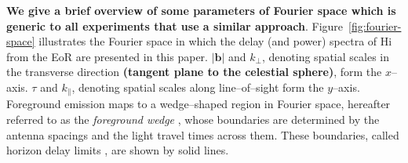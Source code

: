 \documentclass[preprint2,iop,numberedappendix,twocolappendix,appendixfloats]{emulateapj}
\begin{document}
{\bf We give a brief overview of some parameters of Fourier space which is generic to all experiments that use a similar approach}. Figure~\ref{fig:fourier-space} illustrates the Fourier space in which the delay (and power) spectra of H{\sc i} from the EoR are presented in this paper. $|\boldsymbol{b}|$ and $k_\perp$, denoting spatial scales in the transverse direction {\bf (tangent plane to the celestial sphere)}, form the $x$--axis. $\tau$ and $k_\parallel$, denoting spatial scales along line--of--sight form the $y$--axis. Foreground emission maps to a wedge--shaped region in Fourier space, hereafter referred to as the {\it foreground wedge} \citep{dat10}, whose boundaries are determined by the antenna spacings and the light travel times across them. These boundaries, called horizon delay limits \citep{ved12,par12b}, are shown by solid lines. 
\end{document}
